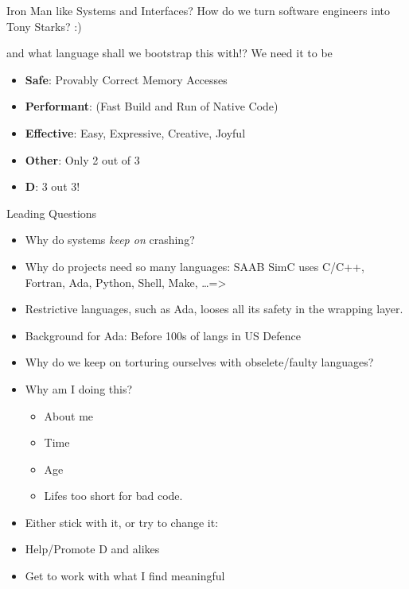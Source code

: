 \documentclass[xcolor=dvipsnames]{beamer}
\begin{document}
\begin{frame}[fragile]{Iron Man like Systems and Interfaces?}
  How do we turn software engineers into Tony Starks? :)
  \begin{figure}
  \end{figure}
  and what language shall we bootstrap this with!? We need it to be
  \begin{itemize}[<+->]
  \item \textbf{Safe}: Provably Correct Memory Accesses
  \item \textbf{Performant}: (Fast Build and Run of Native Code)
  \item \textbf{Effective}: Easy, Expressive, Creative, Joyful
  \end{itemize}

  \begin{itemize}[<+->]
  \item \textbf{Other}: Only 2 out of 3
  \item \textbf{D}: 3 out 3!
  \end{itemize}
\end{frame}

\begin{frame}[fragile]{Leading Questions}
  \begin{itemize}[<+->]
  \item Why do systems \emph{keep on} crashing?
  \item Why do projects need so many languages: SAAB SimC uses C/C++, Fortran,
    Ada, Python, Shell, Make, \ldots =>
  \item Restrictive languages, such as Ada, looses all its safety in the
    wrapping layer.
  \item Background for Ada: Before 100s of langs in US Defence
  \item Why do we keep on torturing ourselves with obselete/faulty languages?
  \item Why am I doing this?
    \begin{itemize}[<+->]
    \item About me
    \item Time
    \item Age
    \item Lifes too short for bad code.
    \end{itemize}
  \item Either stick with it, or try to change it:
  \item Help/Promote D and alikes
  \item Get to work with what I find meaningful
  \end{itemize}
\end{frame}
\end{document}
